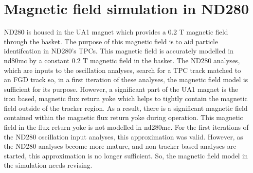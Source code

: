 


\chapter{Magnetic field simulation in ND280}
\label{chap:MagneticFieldSimulation}
ND280 is housed in the UA1 magnet which provides a 0.2 T magnetic field through the basket.  The purpose of this magnetic field is to aid particle identifcation in ND280's TPCs.  This magnetic field is accurately modelled in nd80mc by a constant 0.2 T magnetic field in the basket.  The ND280 analyses, which are inputs to the oscillation analyses, search for a TPC track matched to an FGD track so, in a first iteration of these analyses, the magnetic field model is sufficient for its purpose.
\newline
\newline
However, a significant part of the UA1 magnet is the iron based, magnetic flux return yoke which helps to tightly contain the magnetic field outside of the tracker region.  As a result, there is a significant magnetic field contained within the magnetic flux return yoke during operation.  This magnetic field in the flux return yoke is not modelled in nd280mc.  For the first iterations of the ND280 oscillation input analyses, this approximation was valid.  However, as the ND280 analyses become more mature, and non-tracker based analyses are started, this approximation is no longer sufficient.  So, the magnetic field model in the simulation needs revising. 


